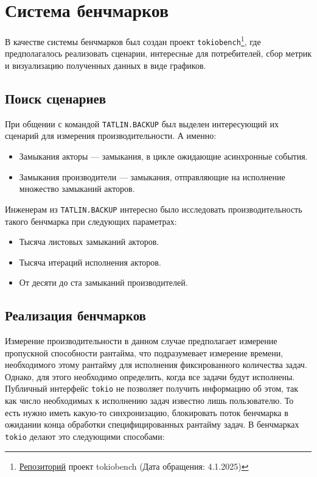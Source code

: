 
\section{Система бенчмарков}

В качестве системы бенчмарков был создан проект \verb|tokiobench|\footnote{\href{https://github.com/IgorErin/tokiobench}{Репозиторий} проект tokiobench (Дата обращения: 4.1.2025)}, где предполагалось реализовать сценарии, интересные для потребителей, сбор метрик и визуализацию полученных данных в виде графиков.

\subsection{Поиск сценариев}

При общении с командой \verb|TATLIN.BACKUP| был выделен интересующий их сценарий для измерения производительности. А именно:

\begin{itemize}
    \item Замыкания акторы --- замыкания, в цикле ожидающие асинхронные события.
    \item Замыкания производители --- замыкания, отправляющие на исполнение множество замыканий акторов.
\end{itemize}

Инженерам из \verb|TATLIN.BACKUP| интересно было исследовать производительность такого бенчмарка при следующих параметрах:

\begin{itemize}
    \item Тысяча листовых замыканий акторов.
    \item Тысяча итераций исполнения акторов.
    \item От десяти до ста замыканий производителей.
\end{itemize}

\subsection{Реализация бенчмарков}

Измерение производительности в данном случае предполагает измерение пропускной способности рантайма, что подразумевает измерение времени, необходимого этому рантайму для исполнения фиксированного количества задач. Однако, для этого необходимо определить, когда все задачи будут исполнены. Публичный интерфейс \verb|tokio| не позволяет получить информацию об этом, так как число необходимых к исполнению задач известно лишь пользователю. То есть нужно иметь какую-то синхронизацию, блокировать поток бенчмарка в ожидании конца обработки специфицированных рантайму задач. В бенчмарках \verb|tokio| делают это следующими способами:

